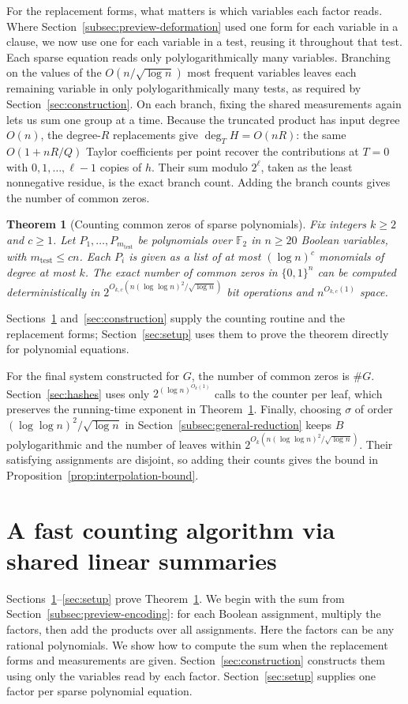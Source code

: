 \documentclass[11pt,reqno]{amsart}
\numberwithin{equation}{section}
\newtheorem{theorem}{Theorem}[section]
\theoremstyle{definition}\newtheorem{definition}[theorem]{Definition}
\theoremstyle{remark}\newtheorem{remark}[theorem]{Remark}
\renewcommand{\le}{\leqslant}
\renewcommand{\ge}{\geqslant}
\begin{document}
For the replacement forms, what matters is which variables each factor
reads. Where Section~\ref{subsec:preview-deformation} used one form
for each variable in a clause, we now use one for each variable in a
test, reusing it throughout that test. Each sparse equation reads only
polylogarithmically many variables. Branching on the values of the
$O(n/\sqrt{\log n})$ most frequent variables leaves each remaining
variable in only polylogarithmically many tests, as required by
Section~\ref{sec:construction}. On each branch, fixing the shared
measurements again lets us sum one group at a time. Because the
truncated product has input degree $O(n)$, the degree-$R$ replacements
give $\deg_T H=O(nR)$: the same $O(1+nR/Q)$ Taylor coefficients per
point recover the contributions at $T=0$ with $0,1,\ldots,\ell-1$
copies of $h$. Their sum modulo $2^\ell$, taken as the least nonnegative
residue, is the exact branch count. Adding the branch counts gives the
number of common zeros.

\begin{theorem}[Counting common zeros of sparse polynomials]
\label{thm:overview-sparse-polynomials}
Fix integers $k\ge2$ and $c\ge1$. Let $P_1,\ldots,P_{m_{\mathrm{test}}}$ be polynomials
over $\mathbb F_2$ in $n\ge20$ Boolean variables, with $m_{\mathrm{test}}\le cn$.
Each $P_i$ is given as a list of at most $(\log n)^c$ monomials
of degree at most $k$. The exact number of common zeros in
$\{0,1\}^n$ can be computed deterministically in
$2^{O_{k,c}(n(\log\log n)^2/\sqrt{\log n})}$ bit operations and
$n^{O_{k,c}(1)}$ space.
\end{theorem}
Sections~\ref{sec:counting} and~\ref{sec:construction} supply the
counting routine and the replacement forms; Section~\ref{sec:setup}
uses them to prove the theorem directly for polynomial equations.

For the final system constructed for $G$, the number of common zeros is $\#G$.
Section~\ref{sec:hashes} uses only $2^{(\log n)^{O_k(1)}}$ calls
to the counter per leaf, which preserves the running-time exponent in
Theorem~\ref{thm:overview-sparse-polynomials}. Finally, choosing
$\sigma$ of order $(\log\log n)^2/\sqrt{\log n}$ in
Section~\ref{subsec:general-reduction} keeps $B$ polylogarithmic
and the number of leaves within $2^{O_k(n(\log\log n)^2/\sqrt{\log n})}$.
Their satisfying assignments are disjoint, so adding their counts
gives the bound in Proposition~\ref{prop:interpolation-bound}.

\section{A fast counting algorithm via shared linear summaries}\label{sec:counting}
Sections~\ref{sec:counting}--\ref{sec:setup} prove
Theorem~\ref{thm:overview-sparse-polynomials}. We begin with the sum
from Section~\ref{subsec:preview-encoding}: for each Boolean assignment,
multiply the factors, then add the products over all assignments.
Here the factors can be any rational polynomials. We show how to
compute the sum when the replacement forms and measurements are given.
Section~\ref{sec:construction} constructs them using only the variables
read by each factor. Section~\ref{sec:setup} supplies one factor per
sparse polynomial equation.
\end{document}

